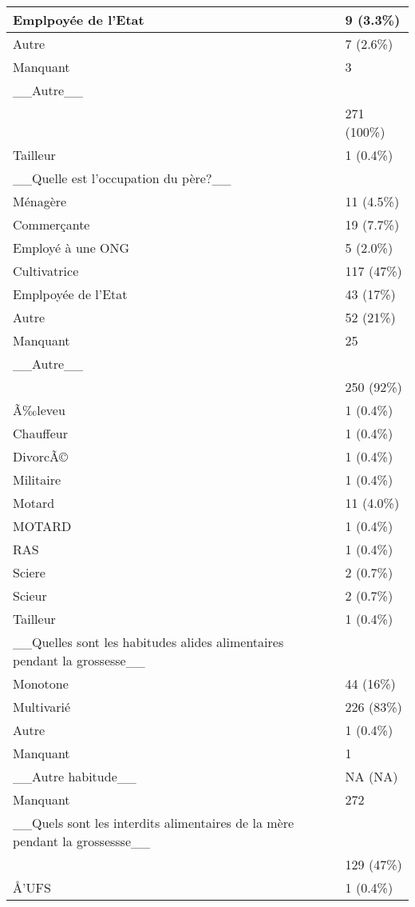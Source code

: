 \documentclass[
]{book}
\begin{document}
\begin{tabular}{l|l}
\hline
Emplpoyée de l'Etat & 9 (3.3\%)\\
\hline
Autre & 7 (2.6\%)\\
\hline
Manquant & 3\\
\hline
\_\_Autre\_\_ & \\
\hline
 & 271 (100\%)\\
\hline
Tailleur & 1 (0.4\%)\\
\hline
\_\_Quelle est l'occupation du père?\_\_ & \\
\hline
Ménagère & 11 (4.5\%)\\
\hline
Commerçante & 19 (7.7\%)\\
\hline
Employé à une ONG & 5 (2.0\%)\\
\hline
Cultivatrice & 117 (47\%)\\
\hline
Emplpoyée de l'Etat & 43 (17\%)\\
\hline
Autre & 52 (21\%)\\
\hline
Manquant & 25\\
\hline
\_\_Autre\_\_ & \\
\hline
 & 250 (92\%)\\
\hline
Ã‰leveu & 1 (0.4\%)\\
\hline
Chauffeur & 1 (0.4\%)\\
\hline
DivorcÃ© & 1 (0.4\%)\\
\hline
Militaire & 1 (0.4\%)\\
\hline
Motard & 11 (4.0\%)\\
\hline
MOTARD & 1 (0.4\%)\\
\hline
RAS & 1 (0.4\%)\\
\hline
Sciere & 2 (0.7\%)\\
\hline
Scieur & 2 (0.7\%)\\
\hline
Tailleur & 1 (0.4\%)\\
\hline
\_\_Quelles sont les habitudes alides alimentaires pendant la grossesse\_\_ & \\
\hline
Monotone & 44 (16\%)\\
\hline
Multivarié & 226 (83\%)\\
\hline
Autre & 1 (0.4\%)\\
\hline
Manquant & 1\\
\hline
\_\_Autre habitude\_\_ & NA  (NA)\\
\hline
Manquant & 272\\
\hline
\_\_Quels sont les interdits alimentaires de la mère pendant la grossessse\_\_ & \\
\hline
 & 129 (47\%)\\
\hline
Å’UFS & 1 (0.4\%)\\

\end{tabular}
\end{document}
